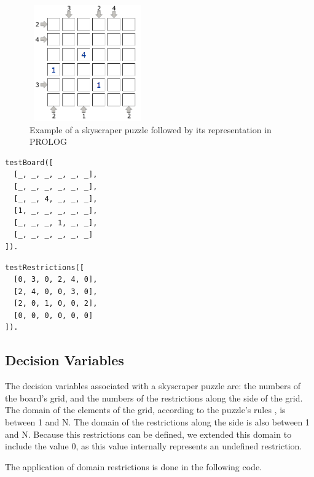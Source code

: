 \documentclass{llncs}
\begin{document}
\begin{figure}[h!]
\begin{center}
\includegraphics[height=5cm,width=5cm]{images/example_skyscraper.png}
\caption{Example of a skyscraper puzzle followed by its representation in PROLOG}
\label{Figure 3}
\end{center}
\end{figure}
\noindent\begin{minipage}{.48\textwidth}
\begin{lstlisting}[frame=tlrb, caption=Prolog grid representation]
testBoard([
  [_, _, _, _, _, _],
  [_, _, _, _, _, _],
  [_, _, 4, _, _, _],
  [1, _, _, _, _, _],
  [_, _, _, 1, _, _],
  [_, _, _, _, _, _]
]).
\end{lstlisting}
\end{minipage}\hfill
\begin{minipage}{.42\textwidth}
\begin{lstlisting}[frame=tblr, caption=Prolog representation of border restrictions]
testRestrictions([
  [0, 3, 0, 2, 4, 0],
  [2, 4, 0, 0, 3, 0],
  [2, 0, 1, 0, 0, 2],
  [0, 0, 0, 0, 0, 0]
]).
\end{lstlisting}
\end{minipage}\hfill

%
\subsection{Decision Variables}

The decision variables associated with a skyscraper puzzle are: the numbers of the board's grid, and the numbers of the restrictions along the side of the grid.
The domain of the elements of the grid, according to the puzzle's rules \cite{skyscrapers_booklet}, is between 1 and N.
The domain of the restrictions along the side is also between 1 and N. Because this restrictions can be defined, we extended this domain to include the value 0, as this value internally represents an undefined restriction.

The application of domain restrictions is done in the following code.
\end{document}

